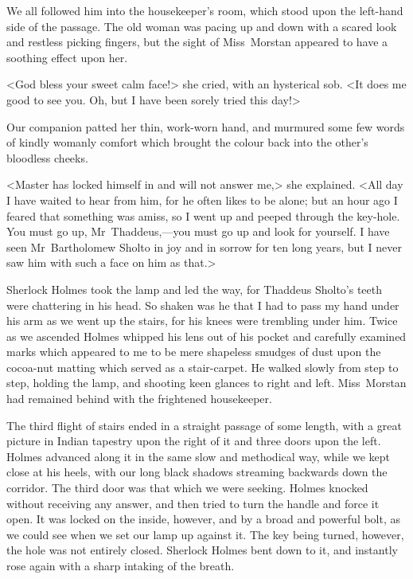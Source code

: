 We all followed him into the housekeeper's room, which stood upon the left-hand side of the passage. The old woman was pacing up and down with a scared look and restless picking fingers, but the sight of Miss~Morstan appeared to have a soothing effect upon her.

<God bless your sweet calm face!> she cried, with an hysterical sob. <It does me good to see you. Oh, but I have been sorely tried this day!>

Our companion patted her thin, work-worn hand, and murmured some few words of kindly womanly comfort which brought the colour back into the other's bloodless cheeks.

<Master has locked himself in and will not answer me,> she explained. <All day I have waited to hear from him, for he often likes to be alone; but an hour ago I feared that something was amiss, so I went up and peeped through the key-hole. You must go up, Mr~Thaddeus,—you must go up and look for yourself. I have seen Mr~Bartholomew Sholto in joy and in sorrow for ten long years, but I never saw him with such a face on him as that.>

Sherlock Holmes took the lamp and led the way, for Thaddeus Sholto's teeth were chattering in his head. So shaken was he that I had to pass my hand under his arm as we went up the stairs, for his knees were trembling under him. Twice as we ascended Holmes whipped his lens out of his pocket and carefully examined marks which appeared to me to be mere shapeless smudges of dust upon the cocoa-nut matting which served as a stair-carpet. He walked slowly from step to step, holding the lamp, and shooting keen glances to right and left. Miss~Morstan had remained behind with the frightened housekeeper.

The third flight of stairs ended in a straight passage of some length, with a great picture in Indian tapestry upon the right of it and three doors upon the left. Holmes advanced along it in the same slow and methodical way, while we kept close at his heels, with our long black shadows streaming backwards down the corridor. The third door was that which we were seeking. Holmes knocked without receiving any answer, and then tried to turn the handle and force it open. It was locked on the inside, however, and by a broad and powerful bolt, as we could see when we set our lamp up against it. The key being turned, however, the hole was not entirely closed. Sherlock Holmes bent down to it, and instantly rose again with a sharp intaking of the breath.

